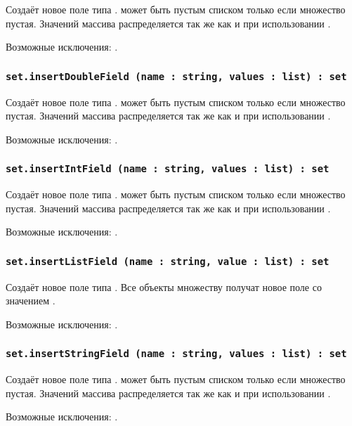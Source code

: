 Создаёт новое поле типа \bool.  может быть пустым списком только если множество пустая. Значений массива распределяется так же как и при использовании .

Возможные исключения: .

\subsubsection{\lstinline|set.insertDoubleField (name : string, values : list) : set|}

Создаёт новое поле типа \double.  может быть пустым списком только если множество пустая. Значений массива распределяется так же как и при использовании .

Возможные исключения: .

\subsubsection{\lstinline|set.insertIntField (name : string, values : list) : set|}

Создаёт новое поле типа \integer.  может быть пустым списком только если множество пустая. Значений массива распределяется так же как и при использовании .

Возможные исключения: .

\subsubsection{\lstinline|set.insertListField (name : string, value : list) : set|}

Создаёт новое поле типа \bool. Все объекты множеству получат новое поле со значением .

Возможные исключения: .

\subsubsection{\lstinline|set.insertStringField (name : string, values : list) : set|}

Создаёт новое поле типа \str.  может быть пустым списком только если множество пустая. Значений массива распределяется так же как и при использовании .

Возможные исключения: .

